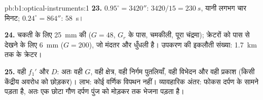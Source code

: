 \begin{solution}{pb:b1:optical-instruments:1}
\textbf{23.} $0.95^\circ = 3420''$: $3420/15 = \qty{230}{s}$, यानी लगभग चार
मिनट; $0.24^\circ = 864''$: \qty{58}{s}।

\textbf{24.} चकती के लिए \qty{25}{mm} की  ($G = 48$, $G_r$ के पास,
चमकीली, पूरा चंद्रमा); क्रेटरों को पास से देखने के लिए \qty{6}{mm} ($G = 200$),
जो मंदतर और धुँधली है। उपकरण की इकलौती संख्या: \qty{1.7}{km} तक के क्रेटर।

\textbf{25.} वही $f_1'$ और $D$: अतः वही $G$, वही क्षेत्र, वही निर्गम पुतलियाँ,
वही विभेदन और वही प्रकाश (किसी केंद्रीय अवरोध को छोड़कर)। लाभ: कोई वर्णिक
विपथन नहीं। व्यावहारिक अंतर: फोकस दर्पण के सामने पड़ता है, अतः एक छोटा गौण
दर्पण पुंज को मोड़कर  तक भेजना पड़ता है।
\end{solution}
